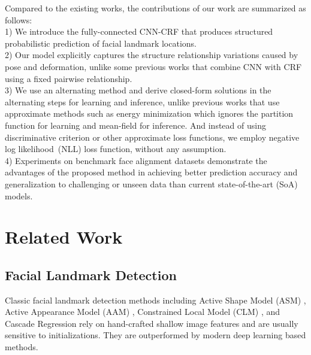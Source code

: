 \documentclass{article}
\begin{document}
Compared to the existing works, the contributions of our work are summarized as follows: \\
1) We introduce the fully-connected CNN-CRF that produces structured probabilistic prediction of facial landmark locations.\\ 2) Our model explicitly captures the structure relationship variations caused by pose and deformation, unlike some previous works that combine CNN with CRF using a fixed pairwise relationship.\\
3) We use an alternating method and derive closed-form solutions in the alternating steps for learning and inference, unlike previous works that use approximate methods such as energy minimization which ignores the partition function for learning and mean-field for inference. And instead of using discriminative criterion or other approximate loss functions, we employ negative log likelihood~(NLL) loss function, without any assumption. \\
4) Experiments on benchmark face alignment datasets demonstrate the advantages of the proposed method in achieving better prediction accuracy and generalization to challenging or unseen data than current state-of-the-art (SoA) models. \\





\section{Related Work} \label{sec:related_work}

  \subsection{Facial Landmark Detection} \label{sub:face_alignment}
  
  Classic facial landmark detection methods including Active Shape Model (ASM) \cite{Cootes1995ASM,Milborrow08ASM_LFF}, Active Appearance Model (AAM) \cite{Cootes98AAM,Kahraman10AAM,Matthews04AAM,Saragih07AAM}, Constrained Local Model (CLM) \cite{Neeraj08CLM_facetracer,Saragih11CLM}, and Cascade Regression \cite{Chen14cascade,Burgos-Artizzu13cascade_COFW,Zhu16cascade_UnconstrainedFA,Cao14cascade_ESR,Xiong15cascade_GSDM} rely on hand-crafted shallow image features and are usually sensitive to initializations. They are outperformed by modern deep learning based methods. 
\end{document}
